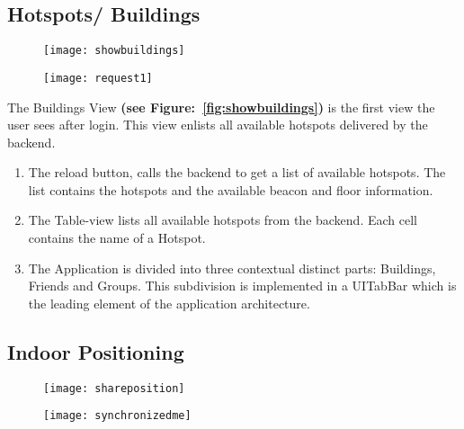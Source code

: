 \subsection{Hotspots/ Buildings}

\begin{figure}
\centering
\begin{minipage}{.5\textwidth}
  \centering
  \texttt{[image: showbuildings]}
  \label{fig:showbuildings}
\end{minipage}%
\begin{minipage}{.5\textwidth}
  \centering
  \texttt{[image: request1]}
  \label{fig:request1}
\end{minipage}
\end{figure}



The Buildings View \textbf{(see Figure:~\ref{fig:showbuildings})} is the first view the user sees after login. This view enlists all available hotspots delivered by the backend.

\begin{enumerate}
  \item The reload button, calls the backend to get a list of available hotspots. The list contains the hotspots and the available beacon and floor information.
  \item The Table-view lists all available hotspots from the backend. Each cell contains the name of a Hotspot.
  \item The Application is divided into three contextual distinct parts: Buildings, Friends and Groups. This subdivision is implemented in a UITabBar which is the leading element of the application architecture.
\end{enumerate}

\subsection{Indoor Positioning}

\begin{figure}
\centering
\begin{minipage}{.5\textwidth}
  \centering
  \texttt{[image: shareposition]}
  \label{fig:shareposition}
\end{minipage}%
\begin{minipage}{.5\textwidth}
  \centering
  \texttt{[image: synchronizedme]}
  \label{fig:synchronizedme}
\end{minipage}
\end{figure}


